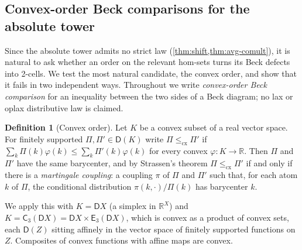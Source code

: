 \documentclass[11pt]{article}
\theoremstyle{definition}
\newtheorem{definition}[theorem]{Definition}
\theoremstyle{remark}
\newcommand{\D}{\mathsf{D}}
\newcommand{\C}{\mathsf{C}}
\newcommand{\E}{\mathsf{E}}
\begin{document}
\subsection{Convex-order Beck comparisons for the absolute tower}\label{sec:cx}

Since the absolute tower admits no strict law (\cref{thm:shift,thm:avg-comult}), it is natural to ask
whether an order on the relevant hom-sets turns its Beck defects into 2-cells. We test the most
natural candidate, the convex order, and show that it fails in two independent ways. Throughout we
write \emph{convex-order Beck comparison} for an inequality between the two sides of a Beck diagram;
no lax or oplax distributive law is claimed.

\begin{definition}[Convex order]
Let $K$ be a convex subset of a real vector space. For finitely supported $\Pi,\Pi'\in\D(K)$ write
$\Pi\le_{\mathrm{cx}}\Pi'$ if $\sum_k\Pi(k)\varphi(k)\le\sum_k\Pi'(k)\varphi(k)$ for every convex
$\varphi\colon K\to\mathbb{R}$. Then $\Pi$ and $\Pi'$ have the same barycenter, and by Strassen's
theorem \cite{Strassen1965} $\Pi\le_{\mathrm{cx}}\Pi'$ if and only if there is a \emph{martingale
coupling}: a coupling $\pi$ of $\Pi$ and $\Pi'$ such that, for each atom $k$ of $\Pi$, the
conditional distribution $\pi(k,\cdot)/\Pi(k)$ has barycenter $k$.
\end{definition}

We apply this with $K=\D X$ (a simplex in $\mathbb{R}^X$) and $K=\C_3(\D X)=\D X\times\E_3(\D X)$, which
is convex as a product of convex sets, each $\D(Z)$ sitting affinely in the vector space of finitely
supported functions on $Z$. Composites of convex functions with affine maps are convex.
\end{document}
